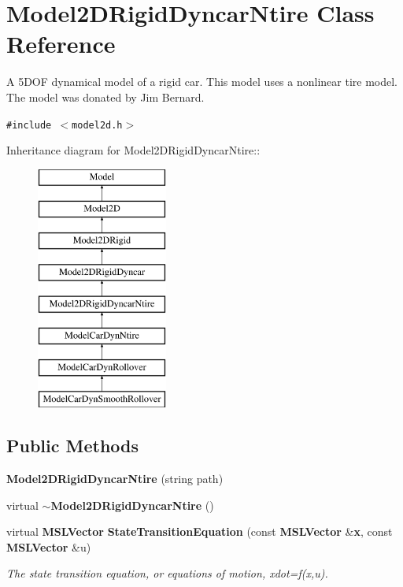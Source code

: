 \section{Model2DRigid\-Dyncar\-Ntire  Class Reference}
\label{classModel2DRigidDyncarNtire}
A 5DOF dynamical model of a rigid car. This model uses a nonlinear tire model. The model was donated by Jim Bernard. 


{\tt \#include $<$model2d.h$>$}

Inheritance diagram for Model2DRigid\-Dyncar\-Ntire::\begin{figure}[H]
\begin{center}
\leavevmode
\includegraphics[height=8cm]{classModel2DRigidDyncarNtire}
\end{center}
\end{figure}
\subsection*{Public Methods}
\begin{CompactItemize}
\item 
{\bf Model2DRigid\-Dyncar\-Ntire} (string path)
\item 
virtual {\bf $\sim$Model2DRigid\-Dyncar\-Ntire} ()
\item 
virtual {\bf MSLVector} {\bf State\-Transition\-Equation} (const {\bf MSLVector} \&{\bf x}, const {\bf MSLVector} \&u)
\begin{CompactList}\small\item\em The state transition equation, or equations of motion, xdot=f(x,u).\item\end{CompactList}\end{CompactItemize}
